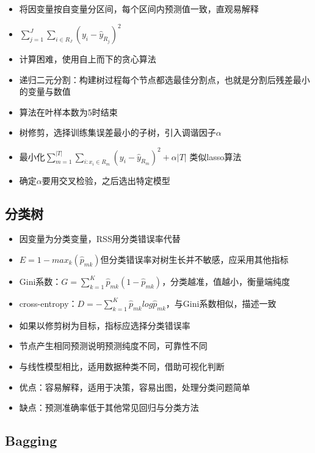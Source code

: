 \documentclass[]{book}
\providecommand{\tightlist}{%
  \setlength{\itemsep}{0pt}\setlength{\parskip}{0pt}}
\begin{document}
\begin{itemize}
\tightlist
\item
  将因变量按自变量分区间，每个区间内预测值一致，直观易解释
\item
  \(\sum_{j = 1}^J\sum_{i \in R_J}(y_i - \hat y_{R_j})^2\)
\item
  计算困难，使用自上而下的贪心算法
\item
  递归二元分割：构建树过程每个节点都选最佳分割点，也就是分割后残差最小的变量与数值
\item
  算法在叶样本数为5时结束
\item
  树修剪，选择训练集误差最小的子树，引入调谐因子\(\alpha\)
\item
  最小化\(\sum_{m = 1}^{|T|} \sum_{i:x_i \in R_m} (y_i - \hat y_{R_m})^2 + \alpha|T|\) 类似lasso算法
\item
  确定\(\alpha\)要用交叉检验，之后选出特定模型
\end{itemize}

\hypertarget{ux5206ux7c7bux6811}{%
\subsection{分类树}\label{ux5206ux7c7bux6811}}

\begin{itemize}
\tightlist
\item
  因变量为分类变量，RSS用分类错误率代替
\item
  \(E = 1 - max_k(\hat p_{mk})\)但分类错误率对树生长并不敏感，应采用其他指标
\item
  Gini系数：\(G = \sum_{k = 1}^K\hat p_{mk}(1 - \hat p_{mk})\)，分类越准，值越小，衡量端纯度
\item
  cross-entropy：\(D = - \sum_{k = 1}^K\hat p_{mk} log\hat p_{mk}\)，与Gini系数相似，描述一致
\item
  如果以修剪树为目标，指标应选择分类错误率
\item
  节点产生相同预测说明预测纯度不同，可靠性不同
\item
  与线性模型相比，适用数据种类不同，借助可视化判断
\item
  优点：容易解释，适用于决策，容易出图，处理分类问题简单
\item
  缺点：预测准确率低于其他常见回归与分类方法
\end{itemize}

\hypertarget{bagging}{%
\subsection{Bagging}\label{bagging}}
\end{document}
